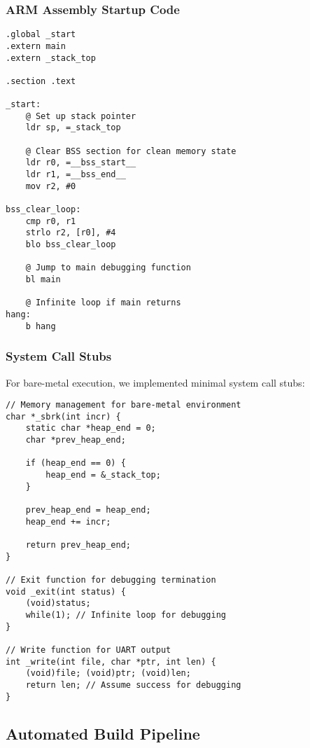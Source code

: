 \documentclass[11pt,a4paper]{article}
\begin{document}
\subsubsection{ARM Assembly Startup Code}

\begin{lstlisting}[language=ARM,caption={Minimal ARM Startup for Memory Debugging}]
.global _start
.extern main
.extern _stack_top

.section .text

_start:
    @ Set up stack pointer
    ldr sp, =_stack_top
    
    @ Clear BSS section for clean memory state
    ldr r0, =__bss_start__
    ldr r1, =__bss_end__
    mov r2, #0
    
bss_clear_loop:
    cmp r0, r1
    strlo r2, [r0], #4
    blo bss_clear_loop
    
    @ Jump to main debugging function
    bl main
    
    @ Infinite loop if main returns
hang:
    b hang
\end{lstlisting}

\subsubsection{System Call Stubs}

For bare-metal execution, we implemented minimal system call stubs:

\begin{lstlisting}[caption={Essential System Call Stubs}]
// Memory management for bare-metal environment
char *_sbrk(int incr) {
    static char *heap_end = 0;
    char *prev_heap_end;

    if (heap_end == 0) {
        heap_end = &_stack_top;
    }
    
    prev_heap_end = heap_end;
    heap_end += incr;
    
    return prev_heap_end;
}

// Exit function for debugging termination
void _exit(int status) {
    (void)status;
    while(1); // Infinite loop for debugging
}

// Write function for UART output
int _write(int file, char *ptr, int len) {
    (void)file; (void)ptr; (void)len;
    return len; // Assume success for debugging
}
\end{lstlisting}

\subsection{Automated Build Pipeline}
\end{document}
